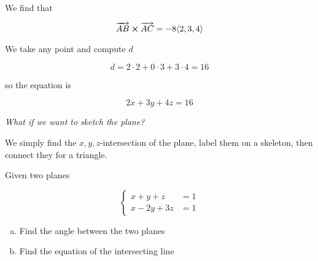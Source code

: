 \begin{sol}
	We find that

	\begin{equation}
		\overrightarrow{AB} \cross \overrightarrow{AC} = -8 \langle 2, 3, 4 \rangle
	\end{equation}

	We take any point and compute $d$

	\begin{equation}
		d = 2\cdot 2 + 0 \cdot 3 + 3 \cdot 4 = 16
	\end{equation}
	
	so the equation is

	\begin{equation}
		2x + 3y + 4z = 16
	\end{equation}
	
	\textit{What if we want to sketch the plane?}

	We simply find the $x,y,z$-intersection of the plane, label them on a skeleton, then connect they for a triangle.
\end{sol}

\begin{example}
	Given two planes

	\begin{equation}
		\begin{cases}
			x+y+z &= 1\\
			x-2y+3z &= 1
		\end{cases}
	\end{equation}

	\begin{enumerate}[a)]
		\item Find the angle between the two planes
		\item Find the equation of the intersecting line
	\end{enumerate}
\end{example}

